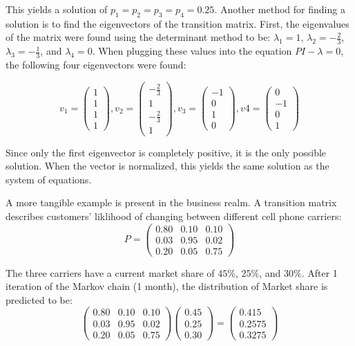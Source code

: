 \message{ !name(Assn1.tex)}\documentclass[twocolumn]{article}
\begin{document}
This yields a solution of $p_1 = p_2 = p_3 = p_4 = 0.25$. Another method for finding a solution is to find the eigenvectors of the transition matrix. First, the eigenvalues of the matrix were found using the determinant method to be: $\lambda_1 = 1$, $\lambda_2 = -\frac{2}{3}$, $\lambda_3 = -\frac{1}{3}$, and $\lambda_4 = 0$. When plugging these values into the equation $PI-\lambda=0$, the following four eigenvectors were found:

\[
v_1 = \begin{pmatrix}1 \\ 1 \\ 1 \\ 1\end{pmatrix}, v_2= \begin{pmatrix}-\frac{2}{3} \\ 1 \\ -\frac{2}{3} \\ 1\end{pmatrix}, v_3= \begin{pmatrix}-1 \\ 0 \\ 1 \\ 0\end{pmatrix}, v4 = \begin{pmatrix}0 \\ -1 \\ 0 \\ 1\end{pmatrix}
\]

Since only the first eigenvector is completely positive, it is the only possible solution. When the vector is normalized, this yields the same solution as the system of equations. 


A more tangible example is present in the business realm. A transition matrix describes customers' liklihood of changing between different cell phone carriers:
\[
P = \begin{pmatrix}
0.80 & 0.10 & 0.10 \\
0.03 & 0.95 & 0.02 \\ 
0.20 & 0.05 & 0.75
\end{pmatrix}
\]

The three carriers have a current market share of $45\%$, $25\%$, and $30\%$. After 1 iteration of the Markov chain (1 month), the distribution of Market share is predicted to be:
\[
\begin{pmatrix}
0.80 & 0.10 & 0.10 \\
0.03 & 0.95 & 0.02 \\ 
0.20 & 0.05 & 0.75
\end{pmatrix} \begin{pmatrix} 0.45 \\ 0.25 \\ 0.30 \end{pmatrix} = \begin{pmatrix} 0.415 \\ 0.2575 \\ 0.3275 \end{pmatrix}
\]
\end{document}
